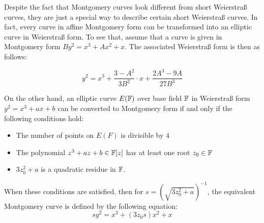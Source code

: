Despite the fact that Montgomery curves look different from short Weierstraß curves, they are just a special way to describe certain short Weierstraß curves. In fact, every curve in affine Montgomery form can be transformed into an elliptic curve in Weierstraß form. To see that, assume that a curve is given in Montgomery form $B y^2 = x^3 + A x^2 + x$. The associated Weierstraß form is then as follows:

\begin{equation}\label{eq:montgomery-to-weierstrass}
y^2 = x^3 + \frac{3-A^2}{3B^2}\cdot x + \frac{2A^3-9A}{27B^3}
\end{equation}

On the other hand, an elliptic curve $E(\mathbb{F})$ over base field $\mathbb{F}$ in Weierstraß form $y^2 = x^3 + a x + b$ can be converted to Montgomery form if and only if the following conditions hold:
\begin{definition}{}\label{def:montgomery}
\begin{itemize}
\item The number of points on $E(F)$ is divisible by $4$
\item The polynomial $z^3 + a z + b \in \mathbb{F}[z]$ has at least one root $z_0\in\mathbb{F}$
\item $3z_0^2 + a$ is a quadratic residue in $\mathbb{F}$.
\end{itemize}
\end{definition}

When these conditions are satisfied, then for $s=({\sqrt{3z_0^{2}+a}})^{-1}$, the equivalent Montgomery curve is defined by the following equation:
\begin{equation}\label{eq:montgomery-form}
sy^{2}=x^{3}+(3z_0 s)x^{2}+x
\end{equation}

